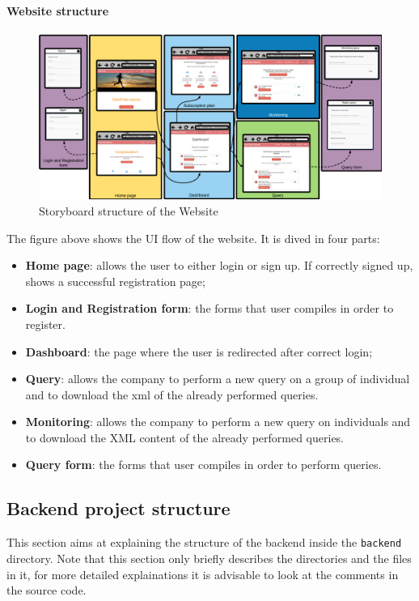 \paragraph{Website structure}
\begin{figure}[H]
	\includegraphics[width=\textwidth,height=\textheight,keepaspectratio]{assets/Website_Flow.pdf}
	\caption{Storyboard structure of the Website}
	\label{fig:StoryBoardWeb}
\end{figure}
The figure above shows the UI flow of the website.
It is dived in four parts:
\begin{itemize}
    \item \textbf{Home page}: allows the user to either login or sign up. If correctly signed up, shows a successful registration page;
    \item \textbf{Login and Registration form}: the forms that user compiles in order to register.
    \item \textbf{Dashboard}: the page where the user is redirected after correct login;
    \item \textbf{Query}: allows the company to perform a new query on a group of individual and to download the xml of the already performed queries.
    \item \textbf{Monitoring}: allows the company to perform a new query on individuals and to download the XML content of the already performed queries.
    \item \textbf{Query form}: the forms that user compiles in order to perform queries.

\end{itemize}



\subsection{Backend project structure}
This section aims at explaining the structure of the backend inside the \texttt{backend} directory.
Note that this section only briefly describes the directories and the files in it, for more detailed explainations it is advisable to look at the comments in the source code.


